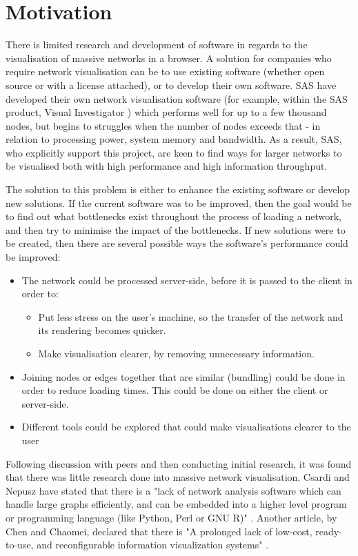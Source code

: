 \documentclass[../dissertation.tex]{subfiles}
\begin{document}
\chapter{Motivation}

There is limited research and development of software in regards to the visualisation of massive networks in a browser. A solution for companies who require network visualisation can be to use existing software (whether open source or with a license attached), or to develop their own software. SAS \cite{sas} have developed their own network visualisation software (for example, within the SAS product, Visual Investigator \cite{sasvi}) which performs well for up to a few thousand nodes, but begins to struggles when the number of nodes exceeds that - in relation to processing power, system memory and bandwidth. As a result, SAS, who explicitly support this project, are keen to find ways for larger networks to be visualised both with high performance and high information throughput.

The solution to this problem is either to enhance the existing software or develop new solutions. If the current software was to be improved, then the goal would be to find out what bottlenecks exist throughout the process of loading a network, and then try to minimise the impact of the bottlenecks. If new solutions were to be created, then there are several possible ways the software's performance could be improved:

\begin{itemize}
	\item The network could be processed server-side, before it is passed to the client in order to:
	\begin{itemize}
	    \item Put less stress on the user's machine, so the transfer of the network and its rendering becomes quicker.
	    \item Make visualisation clearer, by removing unnecessary information.
	\end{itemize}
	\item Joining nodes or edges together that are similar (bundling) could be done in order to reduce loading times. This could be done on either the client or server-side.
	\item Different tools could be explored that could make visualisations clearer to the user
\end{itemize}

Following discussion with peers and then conducting initial research, it was found that there was little research done into massive network visualisation. Csardi and Nepusz have stated that there is a "lack of network analysis software which can handle large graphs efficiently, and can be embedded into a higher level program or programming language (like Python, Perl or GNU R)" \cite{csardi2006igraph}. Another article, by Chen and Chaomei, declared that there is "A prolonged lack of low-cost, ready-to-use, and reconfigurable information visualization systems" \cite{chen2005top}. 
\end{document}
